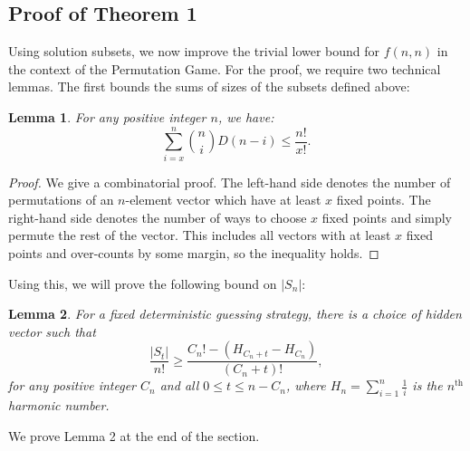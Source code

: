 \documentclass[12pt, a4paper]{article}
\newcommand{\nth}{^{\text{th}}}       %
\newtheorem{lemma}{Lemma}
\begin{document}
	\subsection{Proof of Theorem 1}
	Using solution subsets, we now improve the trivial lower bound for $f(n, n)$ in the context of the Permutation Game. For the proof, we require two technical lemmas. The first bounds the sums of sizes of the subsets defined above:
		 \begin{lemma}  For any positive integer $n$, we have:
		 	\begin{equation*}
		 	\sum_{i=x}^n\binom{n}{i}D(n-i) \le \frac{n!}{x!}.
		 	\end{equation*}
		 \end{lemma}
		 	\begin{proof}
		 		We give a combinatorial proof. The left-hand side denotes the number of permutations of an $n$-element vector which have at least $x$ fixed points. The right-hand side denotes the number of ways to choose $x$ fixed points and simply permute the rest of the vector. This includes all vectors with at least $x$ fixed points and over-counts by some margin, so the inequality holds.
		 	\end{proof}
		 Using this, we will prove the following bound on $|S_n|$:
		 \begin{lemma} For a fixed deterministic guessing strategy, there is a choice of hidden vector such that 
		 	\begin{equation*}
		 	\frac{|S_t|}{n!}\ge \frac{C_{n}! - (H_{C_{n}+t} - H_{C_{n}})}{(C_n+t)!},
		 	\end{equation*}
		 	for any positive integer $C_n$ and all $0\le t\le n-C_{n}$, where $H_n=\sum_{i = 1}^n\frac{1}{i}$ is the $n\nth$ harmonic number.
		 \end{lemma}
		 We prove Lemma 2 at the end of the section.\\
\end{document}
